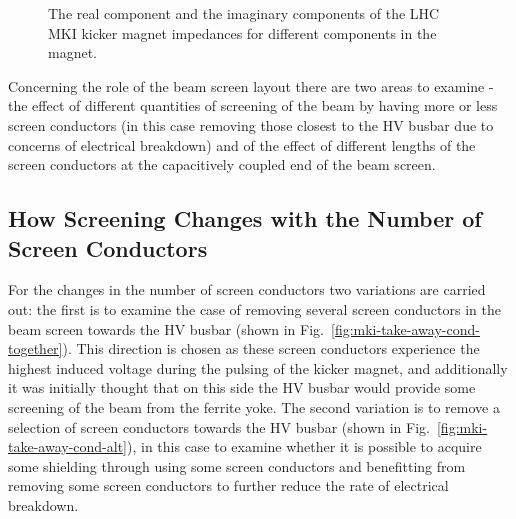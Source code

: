 \begin{figure}
\caption{The  real component and the  imaginary components of the LHC MKI kicker magnet impedances for different components in the magnet.}
\label{fig:mki-buildup-impedance}
\end{figure}


Concerning the role of the beam screen layout there are two areas to examine - the effect of different quantities of screening of the beam by having more or less screen conductors (in this case removing those closest to the HV busbar due to concerns of electrical breakdown) and of the effect of different lengths of the screen conductors at the capacitively coupled end of the beam screen.

\subsection{How Screening Changes with the Number of Screen Conductors}

For the changes in the number of screen conductors two variations are carried out: the first is to examine the case of removing several screen conductors in the beam screen towards the HV busbar (shown in Fig.~\ref{fig:mki-take-away-cond-together}). This direction is chosen as these screen conductors experience the highest induced voltage during the pulsing of the kicker magnet, and additionally it was initially thought that on this side the HV busbar would provide some screening of the beam from the ferrite yoke. The second variation is to remove a selection of screen conductors towards the HV busbar (shown in Fig.~\ref{fig:mki-take-away-cond-alt}), in this case to examine whether it is possible to acquire some shielding through using some screen conductors and benefitting from removing some screen conductors to further reduce the rate of electrical breakdown.

